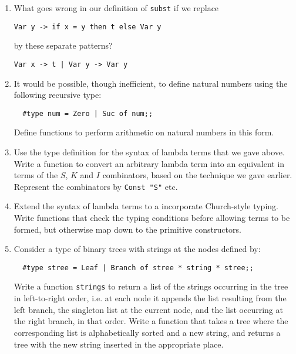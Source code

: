 \begin{enumerate}

\item What goes wrong in our definition of {\tt subst} if we replace

{\verb+Var y -> if x = y then t else Var y+}

\noindent by these separate patterns?

{\verb+Var x -> t | Var y -> Var y+}

\item It would be possible, though inefficient, to define natural numbers using
the following recursive type:

\begin{boxed}\begin{verbatim}
  #type num = Zero | Suc of num;;
\end{verbatim}\end{boxed}

Define functions to perform arithmetic on natural numbers in this form.

\item Use the type definition for the syntax of lambda terms that we gave
above. Write a function to convert an arbitrary lambda term into an equivalent
in terms of the $S$, $K$ and $I$ combinators, based on the technique we gave
earlier. Represent the combinators by \lstinline!Const "S"! etc.

\item Extend the syntax of lambda terms to a incorporate Church-style typing.
Write functions that check the typing conditions before allowing terms to be
formed, but otherwise map down to the primitive constructors.

\item Consider a type of binary trees with strings at the nodes defined by:

\begin{boxed}\begin{verbatim}
  #type stree = Leaf | Branch of stree * string * stree;;
\end{verbatim}\end{boxed}

Write a function {\tt strings} to return a list of the strings occurring in the
tree in left-to-right order, i.e. at each node it appends the list resulting
from the left branch, the singleton list at the current node, and the list
occurring at the right branch, in that order. Write a function that takes a
tree where the corresponding list is alphabetically sorted and a new string,
and returns a tree with the new string inserted in the appropriate place.


\end{enumerate}
